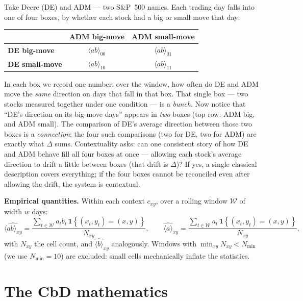 \documentclass[11pt]{article}
\newcommand{\ind}[1]{\mathbf{1}\!\left\{#1\right\}}
\newcommand{\E}[1]{\langle ab\rangle_{#1}}
\begin{document}
\begin{intuition}
Take Deere (DE) and ADM --- two S\&P~500 names. Each trading day falls into one of four boxes,
by whether each stock had a big or small move that day:
\begin{center}\small
\renewcommand{\arraystretch}{1.25}
\begin{tabular}{l|cc}
 & \textbf{ADM big-move} & \textbf{ADM small-move}\\\hline
\textbf{DE big-move}   & $\E{00}$ & $\E{01}$\\
\textbf{DE small-move} & $\E{10}$ & $\E{11}$\\
\end{tabular}
\end{center}
In each box we record one number: over the window, how often do DE and ADM move the
\emph{same} direction on days that fall in that box. That single box --- two stocks measured
together under one condition --- is a \emph{bunch}. Now notice that ``DE's direction on its
big-move days'' appears in \emph{two} boxes (top row: ADM big, and ADM small). The comparison
of DE's average direction between those two boxes is a \emph{connection}; the four such
comparisons (two for DE, two for ADM) are exactly what $\Delta$ sums. Contextuality asks: can
one consistent story of how DE and ADM behave fill all four boxes at once --- allowing each
stock's average direction to drift a little between boxes (that drift is $\Delta$)? If yes, a
single classical description covers everything; if the four boxes cannot be reconciled even
after allowing the drift, the system is contextual.
\end{intuition}

\textbf{Empirical quantities.} Within each context $c_{xy}$, over a rolling window
$\mathcal{W}$ of width $w$ days:
\[
  \widehat{\E{xy}}
  =\frac{\sum_{t\in\mathcal{W}} a_t b_t\,\ind{(x_t,y_t)=(x,y)}}
        {N_{xy}},
  \qquad
  \widehat{\langle a\rangle}_{xy}
  =\frac{\sum_{t\in\mathcal{W}} a_t\,\ind{(x_t,y_t)=(x,y)}}{N_{xy}},
\]
with $N_{xy}$ the cell count, and $\widehat{\langle b\rangle}_{xy}$ analogously. Windows with
$\min_{xy}N_{xy}<N_{\min}$ (we use $N_{\min}=10$) are excluded: small cells mechanically
inflate the statistics.

\section{The CbD mathematics}
\end{document}

